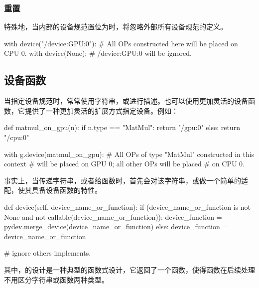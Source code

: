 \begin{content}
\subsubsection{重置}

特殊地，当内部的设备规范置位为时，将忽略外部所有设备规范的定义。

\begin{leftbar}
\begin{python}
with device("/device:GPU:0"):
  # All OPs constructed here will be placed on CPU 0.
  with device(None):
    # /device:GPU:0 will be ignored.
\end{python}
\end{leftbar}

\subsection{设备函数}

当指定设备规范时，常常使用字符串，或进行描述。也可以使用更加灵活的设备函数，它提供了一种更加灵活的扩展方式指定设备。例如：

\begin{leftbar}
\begin{python}
def matmul_on_gpu(n):
 if n.type == "MatMul":
   return "/gpu:0"
 else:
   return "/cpu:0"

with g.device(matmul_on_gpu):
  # All OPs of type "MatMul" constructed in this context
  # will be placed on GPU 0; all other OPs will be placed
  # on CPU 0.
\end{python}
\end{leftbar}

事实上，当传递字符串，或者给函数时，首先会对该字符串，或做一个简单的适配，使其具备设备函数的特性。

\begin{leftbar}
\begin{python}
def device(self, device_name_or_function):
  if (device_name_or_function is not None
      and not callable(device_name_or_function)):
    device_function = pydev.merge_device(device_name_or_function)
  else:
    device_function = device_name_or_function
  
  # ignore others implements.
\end{python}
\end{leftbar}

其中，的设计是一种典型的函数式设计，它返回了一个函数，使得函数在后续处理不用区分字符串或函数两种类型。


\end{content}
